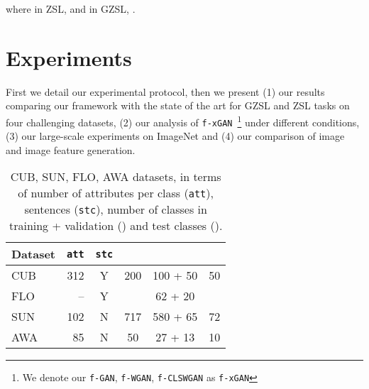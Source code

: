 \documentclass[10pt,twocolumn,letterpaper]{article}
\def\mthd{\texttt{f-xGAN}\xspace}
\begin{document}
where in ZSL,  and in GZSL, .



\section{Experiments}

First we detail our experimental protocol, then we present (1) our results comparing our framework with the state of the art for GZSL and ZSL tasks on four challenging datasets, (2) our analysis of \mthd~\footnote{We denote our \texttt{f-GAN}, \texttt{f-WGAN}, \texttt{f-CLSWGAN} as \texttt{f-xGAN}} under different conditions, (3) our large-scale experiments on ImageNet and (4) our comparison of image and image feature generation.

{
\setlength{\tabcolsep}{4.5pt}
\renewcommand{\arraystretch}{1.2}
\begin{table}[t]
\vspace{-3mm}
 \begin{center}
  \begin{tabular}{ l r c c c c }
\textbf{Dataset}  & \texttt{att} & \texttt{stc} &  &  &   \\     \hline
    CUB~\cite{CaltechUCSDBirdsDataset}  & 312 & Y & 200 & 100 + 50 & 50 \\
    FLO~\cite{OxfordFlowersDataset} & -- & Y &  & 62 + 20 &   \\
    SUN~\cite{PH12}  & 102 & N & 717 & 580 + 65 & 72 \\  
    AWA~\cite{LNH13}  & 85 & N & 50 & 27 + 13 & 10
  \end{tabular}
 \end{center}
 \vspace{-4mm}
\caption{CUB, SUN, FLO, AWA datasets, in terms of number of attributes per class (\texttt{att}), sentences (\texttt{stc}), number of classes in training + validation () and test classes ().}
\label{tab:datasets}
\end{table}
}
\end{document}
